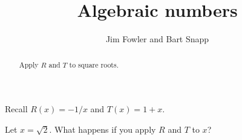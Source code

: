 \documentclass{ximera}
\title{Algebraic numbers}
\author{Jim Fowler and Bart Snapp}
\begin{document}
\begin{abstract}
  Apply $R$ and $T$ to square roots.
\end{abstract}

\maketitle

Recall $R(x) = -1/x$ and $T(x) = 1+x$.   

\begin{question}
  Let $x = \sqrt{2}$.  What happens if you apply $R$ and $T$ to $x$?

  \begin{freeResponse}
  \end{freeResponse}
\end{question}
\end{document}
